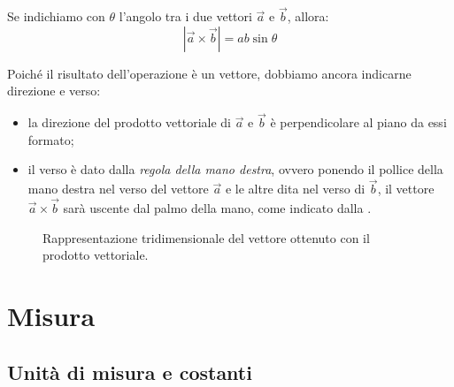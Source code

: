 \documentclass[a4paper,11pt,italian]{article}
\begin{document}
\begin{description}
  Se indichiamo con $ \theta $ l'angolo tra i due vettori $ \vec{a} $ e $ \vec{b} $, allora: 
  \[ | \vec{a} \times \vec{b} | = ab\sin\theta \]

  Poiché il risultato dell'operazione è un vettore, dobbiamo ancora indicarne direzione e verso:
  \begin{itemize}
    \item la direzione del prodotto vettoriale di $ \vec{a} $ e $ \vec{b} $ è perpendicolare al piano da essi formato;
    \item il verso è dato dalla \emph{regola della mano destra}, ovvero ponendo il pollice della mano destra nel verso del vettore $ \vec{a} $ e le altre dita nel verso di $ \vec{b} $, il vettore $ \vec{a} \times \vec{b} $ sarà uscente dal palmo della mano, come indicato dalla .
  \end{itemize}
  
\begin{figure}[htb]\centering
{}\caption{Rappresentazione tridimensionale del vettore ottenuto con il prodotto vettoriale.}
\label{img:vettoriale2}
\end{figure}
\end{description}

\newpage
\section{Misura}

\subsection{Unità di misura e costanti}
\end{document}
